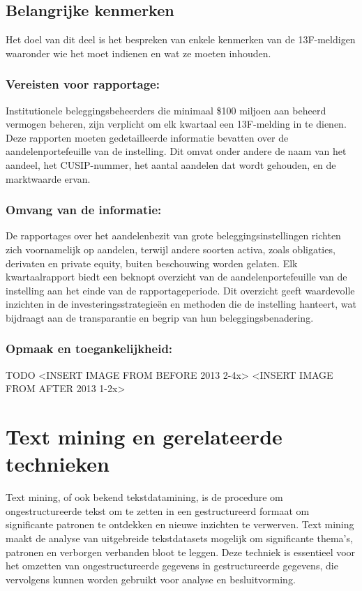 \subsection{Belangrijke kenmerken}
Het doel van dit deel is het bespreken van enkele kenmerken van de 13F-meldigen waaronder wie het moet indienen en wat ze moeten inhouden.


\subsubsection{Vereisten voor rapportage:}

Institutionele beleggingsbeheerders die minimaal \$100 miljoen aan beheerd vermogen beheren, zijn verplicht om elk kwartaal een 13F-melding in te dienen. Deze rapporten moeten gedetailleerde informatie bevatten over de aandelenportefeuille van de instelling. Dit omvat onder andere de naam van het aandeel, het CUSIP-nummer, het aantal aandelen dat wordt gehouden, en de marktwaarde ervan. 

\subsubsection{Omvang van de informatie:}

De rapportages over het aandelenbezit van grote beleggingsinstellingen richten zich voornamelijk op aandelen, terwijl andere soorten activa, zoals obligaties, derivaten en private equity, buiten beschouwing worden gelaten. Elk kwartaalrapport biedt een beknopt overzicht van de aandelenportefeuille van de instelling aan het einde van de rapportageperiode. Dit overzicht geeft waardevolle inzichten in de investeringsstrategieën en methoden die de instelling hanteert, wat bijdraagt aan de transparantie en begrip van hun beleggingsbenadering.


\subsubsection{Opmaak en toegankelijkheid:}
TODO
<INSERT IMAGE FROM BEFORE 2013 2-4x>
<INSERT IMAGE FROM AFTER 2013 1-2x>




\section{Text mining en gerelateerde technieken}
Text mining, of ook bekend tekstdatamining, is de procedure om ongestructureerde tekst om te zetten in een gestructureerd formaat om significante patronen te ontdekken en nieuwe inzichten te verwerven. Text mining maakt de analyse van uitgebreide tekstdatasets mogelijk om significante thema's, patronen en verborgen verbanden bloot te leggen. Deze techniek is essentieel voor het omzetten van ongestructureerde gegevens in gestructureerde gegevens, die vervolgens kunnen worden gebruikt voor analyse en besluitvorming\autocite{IBM2024}.

